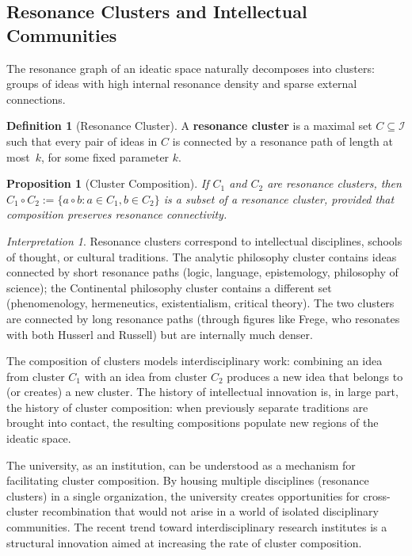 \documentclass[11pt,openany]{book}
\theoremstyle{definition}
\newtheorem{definition}[axiom]{Definition}
\theoremstyle{plain}
\newtheorem{proposition}[axiom]{Proposition}
\theoremstyle{remark}
\newtheorem{interpretation}[axiom]{Interpretation}
\newcommand{\IS}{\mathcal{I}}               %
\newcommand{\compose}{\circ}                 %
\begin{document}
\subsection{Resonance Clusters and Intellectual Communities}

The resonance graph of an ideatic space naturally decomposes into clusters: groups of ideas with high internal resonance density and sparse external connections.

\begin{definition}[Resonance Cluster]
A \textbf{resonance cluster} is a maximal set $C \subseteq \IS$ such that every pair of ideas in $C$ is connected by a resonance path of length at most~$k$, for some fixed parameter $k$.
\end{definition}

\begin{proposition}[Cluster Composition]
If $C_1$ and $C_2$ are resonance clusters, then $C_1 \compose C_2 := \{a \compose b : a \in C_1, b \in C_2\}$ is a subset of a resonance cluster, provided that composition preserves resonance connectivity.
\end{proposition}

\begin{interpretation}
Resonance clusters correspond to intellectual disciplines, schools of thought, or cultural traditions. The analytic philosophy cluster contains ideas connected by short resonance paths (logic, language, epistemology, philosophy of science); the Continental philosophy cluster contains a different set (phenomenology, hermeneutics, existentialism, critical theory). The two clusters are connected by long resonance paths (through figures like Frege, who resonates with both Husserl and Russell) but are internally much denser.

The composition of clusters models interdisciplinary work: combining an idea from cluster $C_1$ with an idea from cluster $C_2$ produces a new idea that belongs to (or creates) a new cluster. The history of intellectual innovation is, in large part, the history of cluster composition: when previously separate traditions are brought into contact, the resulting compositions populate new regions of the ideatic space.

The university, as an institution, can be understood as a mechanism for facilitating cluster composition. By housing multiple disciplines (resonance clusters) in a single organization, the university creates opportunities for cross-cluster recombination that would not arise in a world of isolated disciplinary communities. The recent trend toward interdisciplinary research institutes is a structural innovation aimed at increasing the rate of cluster composition.
\end{interpretation}
\end{document}
